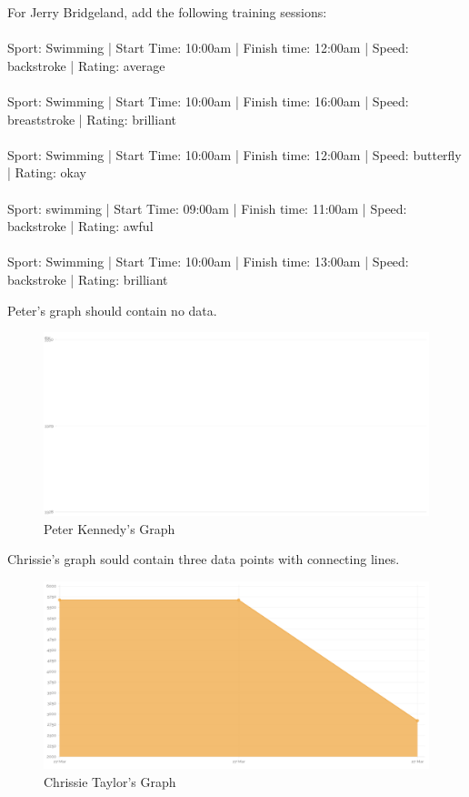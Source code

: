 \documentclass{article}[12pt,a4paper]
\begin{document}
{\begin{framed}
For Jerry Bridgeland, add the following training sessions:\\\\
Sport: Swimming | Start Time: 10:00am | Finish time: 12:00am | Speed: backstroke | Rating: average\\\\
Sport: Swimming | Start Time: 10:00am | Finish time: 16:00am | Speed: breaststroke | Rating: brilliant\\\\
Sport: Swimming | Start Time: 10:00am | Finish time: 12:00am | Speed: butterfly | Rating: okay\\\\
Sport: swimming | Start Time: 09:00am | Finish time: 11:00am | Speed: backstroke | Rating: awful\\\\
Sport: Swimming | Start Time: 10:00am | Finish time: 13:00am | Speed: backstroke | Rating: brilliant
\end{framed}

Peter's graph should contain no data.

\begin{figure}[h!]
    \includegraphics[scale=0.33]{images/testing/graphs/peter}
    \caption{Peter Kennedy's Graph}
\end{figure}

\clearpage

Chrissie's graph sould contain three data points with connecting lines.

\begin{figure}[h!]
    \includegraphics[scale=0.3]{images/testing/graphs/chrissie}
    \caption{Chrissie Taylor's Graph}
\end{figure}

}
\end{document}
